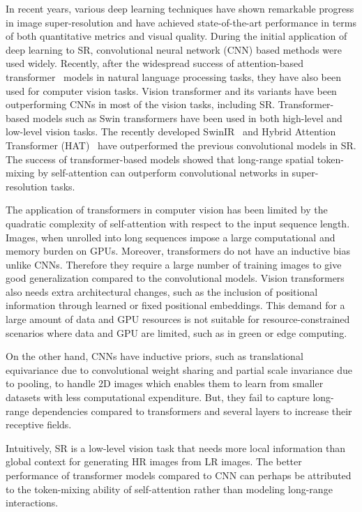 \documentclass{article}
\begin{document}
In recent years, various deep learning techniques have shown remarkable progress in image super-resolution and have achieved state-of-the-art performance in terms of both quantitative metrics and visual quality. During the initial application of deep learning to SR, convolutional neural network (CNN) based methods were used widely. Recently, after the widespread success of attention-based transformer~\cite{vaswani2017attention} models in natural language processing tasks, they have also been used for computer vision tasks. Vision transformer and its variants have been outperforming CNNs in most of the vision tasks, including SR. Transformer-based models such as Swin transformers have been used in both high-level and low-level vision tasks. The recently developed SwinIR~\cite{liang2021swinir} and Hybrid Attention Transformer (HAT)~\cite{Chen_2023_CVPR} have outperformed the previous convolutional models in SR. The success of transformer-based models showed that long-range spatial token-mixing by self-attention can outperform convolutional networks in super-resolution tasks. 



The application of transformers in computer vision has been limited by the quadratic complexity of self-attention with respect to the input sequence length. Images, when unrolled into long sequences impose a large computational and memory burden on GPUs. Moreover, transformers do not have an inductive bias unlike CNNs. Therefore they require a large number of training images to give good generalization compared to the convolutional models. Vision transformers also needs extra architectural changes, such as the inclusion of positional information through learned or fixed positional embeddings. This demand for a large amount of data and GPU resources is not suitable for resource-constrained scenarios where data and GPU are limited, such as in green or edge computing. 


On the other hand, CNNs have inductive priors, such as translational equivariance due to convolutional weight sharing and partial scale invariance due to pooling, to handle 2D images which enables them to learn from smaller datasets with less computational expenditure. But, they fail to capture long-range dependencies compared to transformers and several layers to increase their receptive fields. 

Intuitively, SR is a low-level vision task that needs more local information than global context for generating HR images from LR images. The better performance of transformer models compared to CNN can perhaps be attributed to the token-mixing ability of self-attention rather than modeling long-range interactions.
\end{document}
